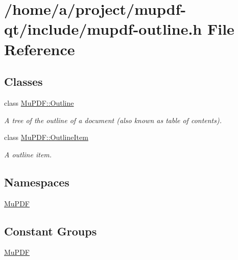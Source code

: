 \hypertarget{mupdf-outline_8h}{\section{/home/a/project/mupdf-\/qt/include/mupdf-\/outline.h File Reference}
\label{mupdf-outline_8h}
}
\subsection*{Classes}
\begin{DoxyCompactItemize}
\item 
class \hyperlink{class_mu_p_d_f_1_1_outline}{Mu\-P\-D\-F\-::\-Outline}
\begin{DoxyCompactList}\small\item\em A tree of the outline of a document (also known as table of contents). \end{DoxyCompactList}\item 
class \hyperlink{class_mu_p_d_f_1_1_outline_item}{Mu\-P\-D\-F\-::\-Outline\-Item}
\begin{DoxyCompactList}\small\item\em A outline item. \end{DoxyCompactList}\end{DoxyCompactItemize}
\subsection*{Namespaces}
\begin{DoxyCompactItemize}
\item 
\hyperlink{namespace_mu_p_d_f}{Mu\-P\-D\-F}
\end{DoxyCompactItemize}
\subsection*{Constant Groups}
\begin{DoxyCompactItemize}
\item 
\hyperlink{namespace_mu_p_d_f}{Mu\-P\-D\-F}
\end{DoxyCompactItemize}
